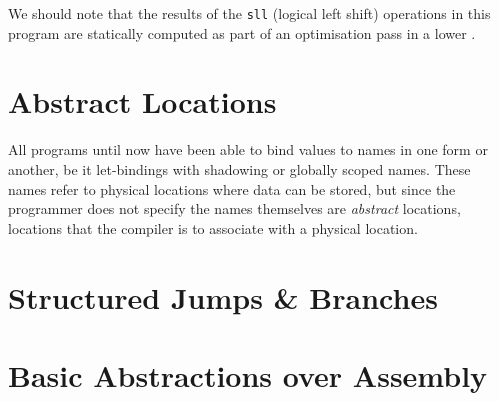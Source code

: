 \documentclass[main.tex]{subfiles}
\begin{document}
We should note that the results of the \texttt{sll} (logical left shift) operations in this program are statically computed as part of an optimisation pass in a lower .

\section{Abstract Locations}
All programs until now have been able to bind values to names in one form or another, be it let-bindings with shadowing or globally scoped names. These names refer to physical locations where data can be stored, but since the programmer does not specify the names themselves are \emph{abstract} locations, locations that the compiler is to associate with a physical location.


\section{Structured Jumps \& Branches}

\section{Basic Abstractions over Assembly}

\biblio{}
\onlyinsubfile{\glsaddall\printglossaries}
\end{document}
